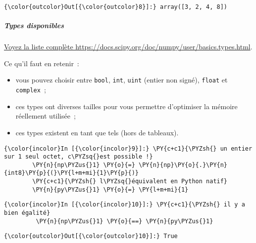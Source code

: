 \begin{Verbatim}[commandchars=\\\{\},frame=single,framerule=0.3mm,rulecolor=\color{cellframecolor}]
{\color{outcolor}Out[{\color{outcolor}8}]:} array([3, 2, 4, 8])
\end{Verbatim}
            
    \hypertarget{types-disponibles}{%
\subparagraph{Types disponibles}\label{types-disponibles}}

    \href{https://docs.scipy.org/doc/numpy/user/basics.types.html}{Voyez la
liste complète https://docs.scipy.org/doc/numpy/user/basics.types.html}.

Ce qu'il faut en retenir~:

\begin{itemize}
\tightlist
\item
  vous pouvez choisir entre \texttt{bool}, \texttt{int}, \texttt{uint}
  (entier non signé), \texttt{float} et \texttt{complex}~;
\item
  ces types ont diverses tailles pour vous permettre d'optimiser la
  mémoire réellement utilisée~;
\item
  ces types existent en tant que tels (hors de tableaux).
\end{itemize}

    \begin{Verbatim}[commandchars=\\\{\},frame=single,framerule=0.3mm,rulecolor=\color{cellframecolor}]
{\color{incolor}In [{\color{incolor}9}]:} \PY{c+c1}{\PYZsh{} un entier sur 1 seul octet, c\PYZsq{}est possible !}
        \PY{n}{np\PYZus{}1} \PY{o}{=} \PY{n}{np}\PY{o}{.}\PY{n}{int8}\PY{p}{(}\PY{l+m+mi}{1}\PY{p}{)}
        \PY{c+c1}{\PYZsh{} l\PYZsq{}équivalent en Python natif}
        \PY{n}{py\PYZus{}1} \PY{o}{=} \PY{l+m+mi}{1}
\end{Verbatim}


    \begin{Verbatim}[commandchars=\\\{\},frame=single,framerule=0.3mm,rulecolor=\color{cellframecolor}]
{\color{incolor}In [{\color{incolor}10}]:} \PY{c+c1}{\PYZsh{} il y a bien égalité}
         \PY{n}{np\PYZus{}1} \PY{o}{==} \PY{n}{py\PYZus{}1}
\end{Verbatim}


\begin{Verbatim}[commandchars=\\\{\},frame=single,framerule=0.3mm,rulecolor=\color{cellframecolor}]
{\color{outcolor}Out[{\color{outcolor}10}]:} True
\end{Verbatim}
            
